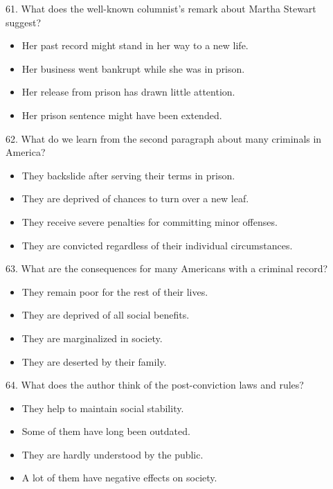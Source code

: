 \documentclass[UTF8,11pt]{ctexart}
\begin{document}
61. What does the well-known columnist’s remark about Martha Stewart suggest?


\begin{itemize}[leftmargin=2em,itemsep=.2em,topsep=.4em]\item[A.] Her past record might stand in her way to a new life.
\item[B.] Her business went bankrupt while she was in prison.
\item[C.] Her release from prison has drawn little attention.
\item[D.] Her prison sentence might have been extended.
\end{itemize}

62. What do we learn from the second paragraph about many criminals in America?


\begin{itemize}[leftmargin=2em,itemsep=.2em,topsep=.4em]\item[A.] They backslide after serving their terms in prison.
\item[B.] They are deprived of chances to turn over a new leaf.
\item[C.] They receive severe penalties for committing minor offenses.
\item[D.] They are convicted regardless of their individual circumstances.
\end{itemize}

63. What are the consequences for many Americans with a criminal record?


\begin{itemize}[leftmargin=2em,itemsep=.2em,topsep=.4em]\item[A.] They remain poor for the rest of their lives.
\item[B.] They are deprived of all social benefits.
\item[C.] They are marginalized in society.
\item[D.] They are deserted by their family.
\end{itemize}

64. What does the author think of the post-conviction laws and rules?


\begin{itemize}[leftmargin=2em,itemsep=.2em,topsep=.4em]\item[A.] They help to maintain social stability.
\end{itemize}

\begin{itemize}[leftmargin=2em,itemsep=.2em,topsep=.4em]\item[B.] Some of them have long been outdated.
\item[C.] They are hardly understood by the public.
\item[D.] A lot of them have negative effects on society.
\end{itemize}
\end{document}
